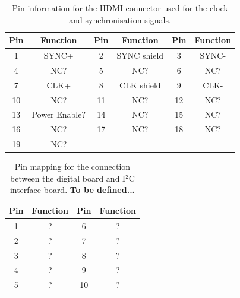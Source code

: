 \documentclass[a4paper]{article}
\def\I2C{I$^2$C}
\begin{document}
\begin{table}[h]
    \begin{center}
        \caption{Pin information for the HDMI connector used for the clock and synchronisation signals.}
        \label{tab:ClockSyncPins}
        \begin{tabular}{cc|cc|cc}
            \hline
            \hline
            Pin & Function & Pin & Function & Pin & Function \\
            \hline
            1 & SYNC+ & 2 & SYNC shield  & 3 & SYNC- \\
            4 & NC? & 5 & NC? & 6 & NC? \\
            7 & CLK+ & 8 & CLK shield & 9 & CLK- \\
            10 & NC? & 11 & NC? & 12 & NC? \\
            13 & Power Enable? & 14 & NC? & 15 & NC? \\
            16 & NC? & 17 & NC? & 18 & NC? \\
            19 & NC? & & & & \\
            \hline
            \hline
        \end{tabular}
    \end{center}
\end{table}

\begin{table}[h]
    \begin{center}
        \caption{Pin mapping for the connection between the digital board and \I2C interface board. {\bf To be defined...}}
        \label{tab:digitalToI2CInterface}
        \begin{tabular}{cc|cc}
            \hline
            \hline
            Pin & Function & Pin & Function \\
            \hline
            1 & ? & 6 & ? \\
            2 & ? & 7 & ? \\
            3 & ? & 8 & ? \\
            4 & ? & 9 & ? \\
            5 & ? & 10 & ? \\
            \hline
            \hline
        \end{tabular}
    \end{center}
\end{table}
\end{document}
